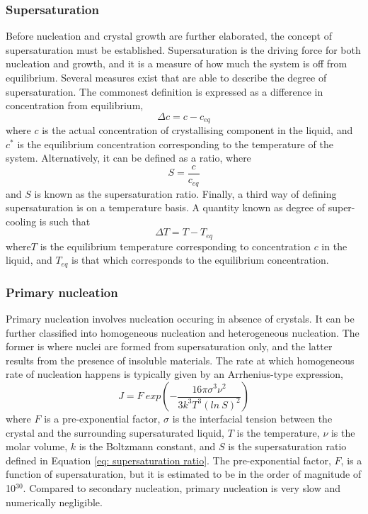 \subsubsection{Supersaturation}

Before nucleation and crystal growth are further elaborated, the concept of supersaturation must be established. Supersaturation is the driving force for both nucleation and growth, and it is a measure of how much the system is off from equilibrium. Several measures exist that are able to describe the degree of supersaturation. The commonest definition is expressed as a difference in concentration from equilibrium,
\begin{equation}
    \Delta c = c - c_{eq}
\end{equation}
where $c$ is the actual concentration of crystallising component in the liquid, and $c^*$ is the equilibrium concentration corresponding to the temperature of the system. Alternatively, it can be defined as a ratio, where
\begin{equation} \label{eq: supersaturation ratio}
    S = \frac{c}{c_{eq}}
\end{equation}
and $S$ is known as the supersaturation ratio. Finally, a third way of defining supersaturation is on a temperature basis. A quantity known as degree of super-cooling is such that
\begin{equation}
     \Delta T = T - T_{eq}
\end{equation}
where$T$ is the equilibrium temperature corresponding to concentration $c$ in the liquid, and $T_{eq}$ is that which corresponds to the equilibrium concentration. 

\subsubsection{Primary nucleation}

Primary nucleation involves nucleation occuring in absence of crystals. \cite{seader_separation_2011} It can be further classified into homogeneous nucleation and heterogeneous nucleation. The former is where nuclei are formed from supersaturation only, and the latter results from the presence of insoluble materials. \cite{richardson} The rate at which homogeneous rate of nucleation happens is typically given by an Arrhenius-type expression, \cite{richardson}
\begin{equation}
     J = F~exp(-\frac{16 \pi \sigma^3 \nu^2}{3 k^3 T^3 (ln~S)^2})
\end{equation}
where $F$ is a pre-exponential factor, $\sigma$ is the interfacial tension between the crystal and the surrounding supersaturated liquid, $T$ is the temperature, $\nu$ is the molar volume, $k$ is the Boltzmann constant, and $S$ is the supersaturation ratio defined in Equation \ref{eq: supersaturation ratio}. The pre-exponential factor, $F$, is a function of supersaturation, but it is estimated to be in the order of magnitude of 10$^{30}$. Compared to secondary nucleation, primary nucleation is very slow and numerically negligible. 

